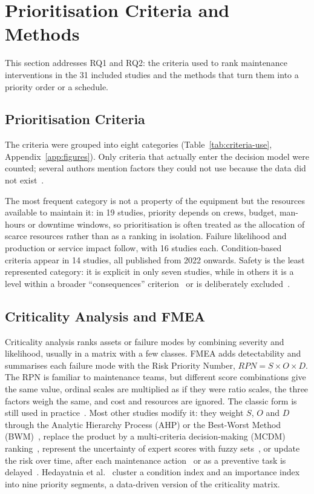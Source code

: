 \section{Prioritisation Criteria and Methods}
\label{sec:criteria-methods}

This section addresses RQ1 and RQ2: the criteria used to rank maintenance interventions in the 31 included studies and the methods that turn them into a priority order or a schedule.

\subsection{Prioritisation Criteria}
\label{sec:prio-criteria}

The criteria were grouped into eight categories (Table~\ref{tab:criteria-use}, Appendix~\ref{app:figures}). Only criteria that actually enter the decision model were counted; several authors mention factors they could not use because the data did not exist~\cite{tang2026,wehbi2026,rios2025,wittbrodt2026,geng2022}.

The most frequent category is not a property of the equipment but the resources available to maintain it: in 19 studies, priority depends on crews, budget, man-hours or downtime windows, so prioritisation is often treated as the allocation of scarce resources rather than as a ranking in isolation. Failure likelihood and production or service impact follow, with 16 studies each. Condition-based criteria appear in 14 studies, all published from 2022 onwards. Safety is the least represented category: it is explicit in only seven studies, while in others it is a level within a broader ``consequences'' criterion~\cite{ozcan2021,bulut2021} or is deliberately excluded~\cite{yang2021}.

\subsection{Criticality Analysis and FMEA}
\label{sec:fmea}

Criticality analysis ranks assets or failure modes by combining severity and likelihood, usually in a matrix with a few classes. FMEA adds detectability and summarises each failure mode with the Risk Priority Number, $RPN = S \times O \times D$. The RPN is familiar to maintenance teams, but different score combinations give the same value, ordinal scales are multiplied as if they were ratio scales, the three factors weigh the same, and cost and resources are ignored. The classic form is still used in practice~\cite{delgado2026,hall2021}. Most other studies modify it: they weight $S$, $O$ and $D$ through the Analytic Hierarchy Process (AHP) or the Best-Worst Method (BWM)~\cite{rios2025,qiu2026,enjavimadar2022}, replace the product by a multi-criteria decision-making (MCDM) ranking~\cite{enjavimadar2022,moradi2024,panwar2021,zhou2024}, represent the uncertainty of expert scores with fuzzy sets~\cite{rios2025,bahadir2026,qiu2026}, or update the risk over time, after each maintenance action~\cite{qiu2026} or as a preventive task is delayed~\cite{shaulagara2023}. Hedayatnia et al.~\cite{hedayatnia2025} cluster a condition index and an importance index into nine priority segments, a data-driven version of the criticality matrix.

